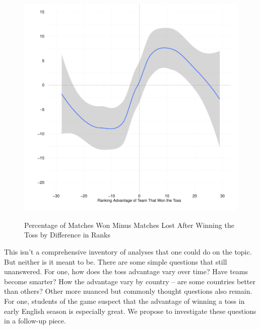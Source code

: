 \documentclass[12pt]{article}
\begin{document}
\begin{figure}[htbp]
\centering
\caption{Percentage of Matches Won Minus Matches Lost After Winning the Toss by Difference in Ranks}
\includegraphics[scale=.85]{../figs/winbyRank.pdf}
\label{fig:ranks}
\end{figure}

This isn't a comprehensive inventory of analyses that one could do on the topic. But neither is it meant to be. There are some simple questions that still unanswered. For one, how does the toss advantage vary over time? Have teams become smarter? How the advantage vary by country -- are some countries better than others? Other more nuanced but commonly thought questions also remain. For one, students of the game suspect that the advantage of winning a toss in early English season is especially great. We propose to investigate these questions in a follow-up piece.

\clearpage


\end{document}
